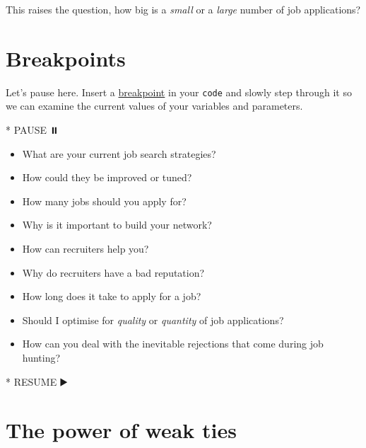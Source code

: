 \documentclass[
]{book}
\newenvironment{Shaded}{\begin{snugshade}}{\end{snugshade}}
\newcommand{\NormalTok}[1]{#1}
\newcommand{\SpecialStringTok}[1]{\textcolor[rgb]{0.31,0.60,0.02}{#1}}
\providecommand{\tightlist}{%
  \setlength{\itemsep}{0pt}\setlength{\parskip}{0pt}}
\begin{document}
This raises the question, how big is a \emph{small} or a \emph{large} number of job applications?

\hypertarget{bp8}{%
\section{Breakpoints}\label{bp8}}

Let's pause here. Insert a \href{https://en.wikipedia.org/wiki/Breakpoint}{breakpoint} in your \texttt{code} and slowly step through it so we can examine the current values of your variables and parameters.

\begin{Shaded}
\begin{Highlighting}[]
\SpecialStringTok{* }\NormalTok{PAUSE ⏸️}
\end{Highlighting}
\end{Shaded}

\begin{itemize}
\tightlist
\item
  What are your current job search strategies?
\item
  How could they be improved or tuned?
\item
  How many jobs should you apply for?\\
\item
  Why is it important to build your network?
\item
  How can recruiters help you?
\item
  Why do recruiters have a bad reputation?
\item
  How long does it take to apply for a job?
\item
  Should I optimise for \emph{quality} or \emph{quantity} of job applications?
\item
  How can you deal with the inevitable rejections that come during job hunting?
\end{itemize}

\begin{Shaded}
\begin{Highlighting}[]
\SpecialStringTok{* }\NormalTok{RESUME ▶️}
\end{Highlighting}
\end{Shaded}

\hypertarget{weakties}{%
\section{The power of weak ties}\label{weakties}}
\end{document}
